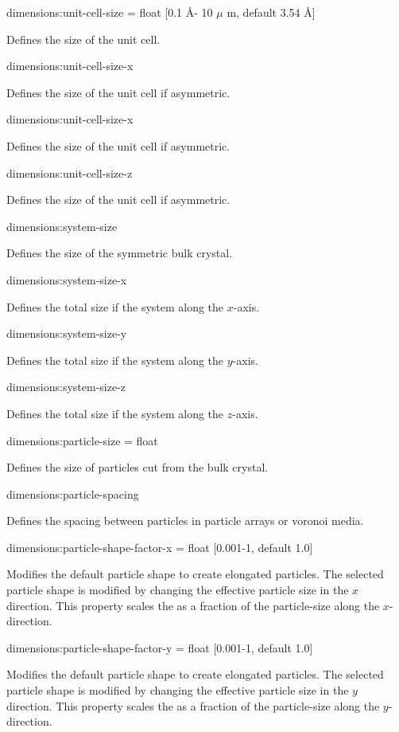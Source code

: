 {\zicf dimensions:unit-cell-size = float [0.1 \AA - 10 $\mu$ m, default 3.54 \AA]} Defines the size of the unit cell.

{\zicf dimensions:unit-cell-size-x} Defines the size of the unit cell if asymmetric.

{\zicf dimensions:unit-cell-size-x} Defines the size of the unit cell if asymmetric.

{\zicf dimensions:unit-cell-size-z} Defines the size of the unit cell if asymmetric.

{\zicf dimensions:system-size} Defines the size of the symmetric bulk crystal.

{\zicf dimensions:system-size-x} Defines the total size if the system along the $x$-axis.

{\zicf dimensions:system-size-y} Defines the total size if the system along the $y$-axis.

{\zicf dimensions:system-size-z} Defines the total size if the system along the $z$-axis.

{\zicf dimensions:particle-size = float} Defines the size of particles cut from the bulk crystal.

{\zicf dimensions:particle-spacing} Defines the spacing between particles in particle arrays or voronoi media.


{\zicf dimensions:particle-shape-factor-x = float [0.001-1, default 1.0]}  Modifies the default particle shape to create elongated particles. The selected particle shape is modified by changing the effective particle size in the $x$ direction. This property scales the as a fraction of the particle-size along the $x$-direction.

{\zicf dimensions:particle-shape-factor-y = float [0.001-1, default 1.0]}  Modifies the default particle shape to create elongated particles. The selected particle shape is modified by changing the effective particle size in the $y$ direction. This property scales the as a fraction of the particle-size along the $y$-direction.

